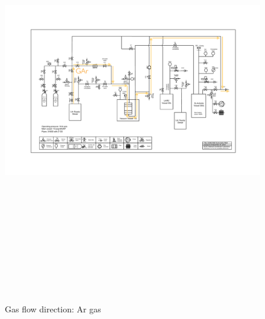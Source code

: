 \documentclass[letterpaper,11pt]{article}
\begin{document}
\begin{figure}[htb]
\begin{center}
\includegraphics[angle=90,origin=c,height=7.3in]{fig/RegenerationAr_PIDv8.4.pdf}
\caption{Gas flow direction: Ar gas}
\label{fig:ArFlow}
\end{center}
\end{figure}
\clearpage
\end{document}
